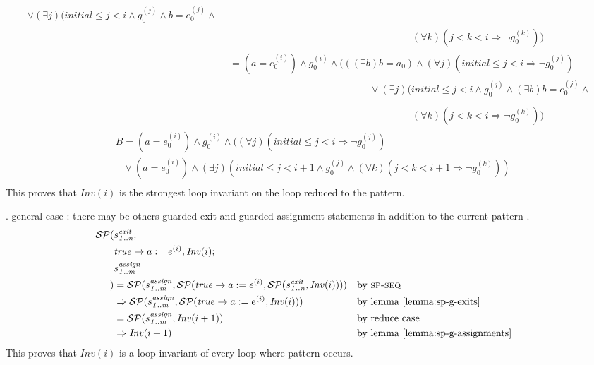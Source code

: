 \documentclass[a4paper,10pt]{article}
\newcommand{\idx}{\ensuremath{i}\xspace}
\newcommand{\idxinitial}{\ensuremath{\mathit{initial}}\xspace}
\newcommand{\at}[1]{{(#1)}}
\newcommand{\impl}{\ensuremath{\Longrightarrow}}
\newcommand{\Inv}[1]{\ensuremath{\mathit{Inv}(#1)\xspace}}
\newcommand{\gstatement}[2]{\ensuremath{s^{\mathit{#1}}_{\mathit{#2}}\xspace}}
\newcommand{\spseq}{\textsc{sp-seq}\xspace}
\newenvironment{proof}[1][Proof.]{\begin{trivlist}
\item[\hskip \labelsep {\bfseries #1}]}{\end{trivlist}}
\begin{document}
\begin{proof}
\begin{align*}
       \lor (\exists j)(\idxinitial \leq j < \idx \land g_0^\at{j} \land b = e_0^\at{j} \land \\
    &\phantom{B=(a = e_0^\at{\idx}) \land g_0^\at{\idx} \land (\exists b)(\Inv{\idx}[}
       (\forall k)(j < k < \idx \impl \neg g_0^\at{k}))\\
    &~~=(a = e_0^\at{\idx}) \land g_0^\at{\idx} \land  (((\exists b)b = a_0) \land (\forall j)(\idxinitial \leq j < \idx \impl \neg g_0^\at{j})\\ 
    &\phantom{B=(a = e_0^\at{\idx}) \land g_0^\at{\idx} \land (\exists b)}
       \lor (\exists j)(\idxinitial \leq j < \idx \land g_0^\at{j} \land (\exists b)b = e_0^\at{j} \land \\
    &\phantom{B=(a = e_0^\at{\idx}) \land g_0^\at{\idx} \land (\exists b)(\Inv{\idx}[}
       (\forall k)(j < k < \idx \impl \neg g_0^\at{k}))
  \end{align*}
  \begin{align*}
    &B=(a = e_0^\at{\idx}) \land g_0^\at{\idx} \land  ((\forall j)(\idxinitial \leq j < \idx \impl \neg g_0^\at{j})\\ 
    &\phantom{B}
       \lor (a = e_0^\at{\idx}) \land (\exists j)(\idxinitial \leq j < \idx+1 \land g_0^\at{j} \land 
       (\forall k)(j < k < \idx+1 \impl \neg g_0^\at{k}))\\
  \end{align*}
  This proves that \Inv{\idx} is the strongest loop invariant on the 
  loop reduced to the pattern. 

. general case : there may be others guarded exit and guarded assignment statements
                  in addition to the current pattern \curpattern.\\
  \begin{align*}
    \spost{
      &\gstatement{exit}{1..n};\\
      &\mathit{true} \rightarrow a := e^\at{\idx}}{\Inv{\idx};\\
      &\gstatement{assign}{1..m}\\
    }
    &= \spost{\gstatement{assign}{1..m}}{\spost{\mathit{true} \rightarrow a := e^\at{\idx}}
        {\spost{\gstatement{exit}{1..n}}{\Inv{\idx}}}} && \text{by \spseq} \\ 
    &\Rightarrow \spost{\gstatement{assign}{1..m}}
        {\spost{\mathit{true} \rightarrow a := e^\at{\idx}}{\Inv{\idx}}} && \text{by lemma \ref{lemma:sp-g-exits}} \\ 
    &= \spost{\gstatement{assign}{1..m}}{\Inv{\idx+1}} && \text{by reduce case} \\ 
    &\Rightarrow \Inv{\idx+1} && \text{by lemma \ref{lemma:sp-g-assignments}}
  \end{align*}
  This proves that \Inv{\idx} is a loop invariant of every loop where pattern
  \curpattern occurs.
\end{proof}
\end{document}
